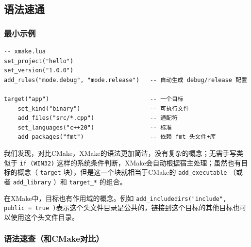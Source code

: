 \subsection{语法速通}
\subsubsection{最小示例}
\begin{verbatim}
-- xmake.lua
set_project("hello")
set_version("1.0.0")
add_rules("mode.debug", "mode.release")   -- 自动生成 debug/release 配置

target("app")                             -- 一个目标
    set_kind("binary")                    -- 可执行文件
    add_files("src/*.cpp")                -- 通配符
    set_languages("c++20")                -- 标准
    add_packages("fmt")                   -- 依赖 fmt 头文件+库
\end{verbatim}
我们发现，对比CMake，XMake的语法更加简洁，没有复杂的概念；无需手写类似于 \texttt{if (WIN32)} 这样的系统条件判断，XMake会自动根据宿主处理；虽然也有目标的概念（ \texttt{target} 块），但是这一个块就相当于CMake的 \texttt{add\_executable} （或者 \texttt{add\_library} ）和 \texttt{target\_*} 的组合。

在XMake中，目标也有作用域的概念。例如 \texttt{add\_includedirs("include", {public = true} )}表示这个头文件目录是公共的，链接到这个目标的其他目标也可以使用这个头文件目录。

\subsubsection{语法速查（和CMake对比）}

